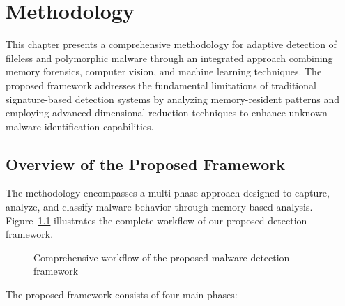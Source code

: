 \chapter{Methodology}
\label{ch:methodology}

This chapter presents a comprehensive methodology for adaptive detection of fileless and polymorphic malware through an integrated approach combining memory forensics, computer vision, and machine learning techniques. The proposed framework addresses the fundamental limitations of traditional signature-based detection systems by analyzing memory-resident patterns and employing advanced dimensional reduction techniques to enhance unknown malware identification capabilities.

\section{Overview of the Proposed Framework}
\label{sec:methodology-overview}

The methodology encompasses a multi-phase approach designed to capture, analyze, and classify malware behavior through memory-based analysis. Figure~\ref{fig:methodology-overview} illustrates the complete workflow of our proposed detection framework.

\begin{figure}[!htbp]
\centering
\caption{Comprehensive workflow of the proposed malware detection framework}
\label{fig:methodology-overview}
\end{figure}

The proposed framework consists of four main phases:

